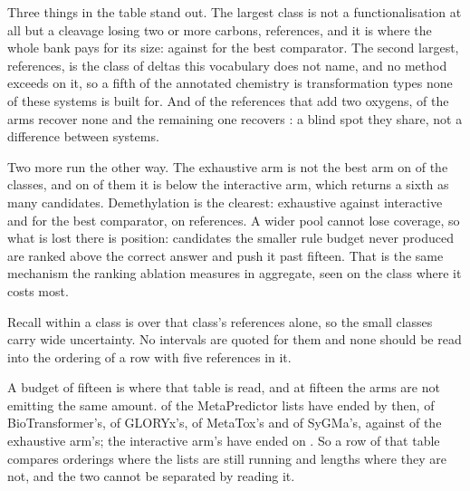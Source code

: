 \documentclass[journal=jcisd8,manuscript=suppinfo,layout=onecolumn]{achemso}
\begin{document}
Three things in the table stand out. The largest class is not a functionalisation at all
but a cleavage losing two or more carbons, \numChemCleavageRefs{} references, and it is where the
whole bank pays for its size: \numChemCleavageBank{} against \numChemCleavageBestother{} for the
best comparator. The second largest, \numChemOtherRefs{} references, is the class of deltas this
vocabulary does not name, and no method exceeds \numChemOtherBest{} on it, so a fifth of the
annotated chemistry is transformation types none of these systems is built for. And of the
\numChemDiolRefsWord{} references that add two oxygens, \numChemDiolRecovernoneWord{} of the
\numChemArmsWord{} arms recover none and the remaining one recovers \numChemDiolBest{}: a blind spot
they share, not a difference between
systems.

Two more run the other way. The exhaustive arm is not the best arm
on \numChemBehind{} of the \numChemClasses{} classes, and on
\numChemIntahead{} of them it is below the interactive arm, which returns a sixth as many
candidates. Demethylation is the clearest: \numChemDemethbank{} exhaustive against
\numChemDemethinter{} interactive and \numChemDemethbest{} for the best comparator, on
\numChemDemethrefs{} references. A wider pool cannot lose coverage, so what is lost there is
position: candidates the smaller rule budget never produced are ranked above the correct answer
and push it past fifteen. That is the same mechanism the ranking ablation measures in aggregate,
seen on the class where it costs most.

Recall within a class is over that class's references alone, so the small classes carry wide
uncertainty. No intervals are quoted for them and none should be read into the ordering of a row
with five references in it.


A budget of fifteen is where that table is read, and at fifteen the \numChemArmsWord{} arms are not
emitting the
same amount. \numChemExhaustedMetapredictor{} of the \numPopulationN{} MetaPredictor lists have
ended by then, \numChemExhaustedBiotransformer{} of BioTransformer's,
\numChemExhaustedGloryx{} of GLORYx's, \numChemExhaustedMetatox{} of MetaTox's and
\numChemExhaustedSygma{} of SyGMa's, against \numChemExhaustedBank{} of the exhaustive arm's;
the interactive arm's have ended on \numChemExhaustedInteractive{}. So a row of that table
compares orderings where the lists are still running and lengths where they are not, and the two
cannot be separated by reading it.
\end{document}
